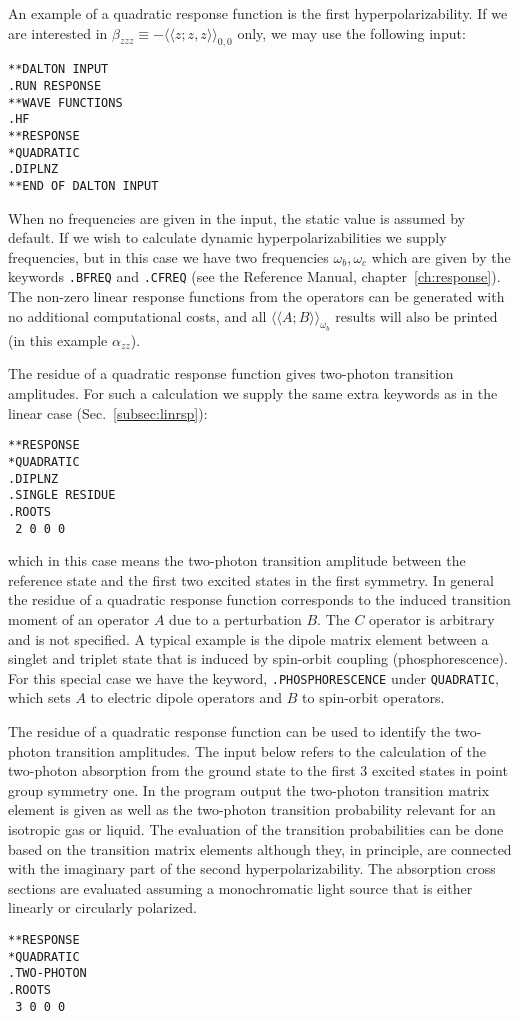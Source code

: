 An example of a quadratic response function
is the first 
hyperpolarizability. If we are
interested in
$\beta_{zzz}\equiv-\langle\!\langle z;z,z\rangle\!\rangle_{0,0}$ 
only, we may use the following input:
\begin{verbatim}
**DALTON INPUT
.RUN RESPONSE
**WAVE FUNCTIONS
.HF
**RESPONSE
*QUADRATIC
.DIPLNZ
**END OF DALTON INPUT
\end{verbatim}
When no frequencies are given in the input, the static value is assumed by
default. If we wish to calculate dynamic hyperpolarizabilities we supply
frequencies, but in this case we have two frequencies
$\omega_b, \omega_c$ which are given by the keywords \texttt{.BFREQ} and
{\tt .CFREQ} (see the Reference Manual, chapter~\ref{ch:response}).
The non-zero linear response functions from the operators can be
generated with no additional computational costs, and all
$\langle\!\langle A;B\rangle\!\rangle_{\omega_b}$ results
will also be printed (in this example $\alpha_{zz}$).

The residue of a quadratic response function gives two-photon
transition amplitudes. For such a
calculation we supply the same extra 
keywords as in the linear case (Sec.~\ref{subsec:linrsp}):
\begin{verbatim}
**RESPONSE
*QUADRATIC
.DIPLNZ
.SINGLE RESIDUE
.ROOTS
 2 0 0 0
\end{verbatim}
which in this case means the two-photon transition
amplitude between the
reference state and the first two excited states in the first symmetry.  In
general the residue of a quadratic response function corresponds to the
induced transition moment of an operator $A$ due to a perturbation $B$.
The $C$ operator is arbitrary and is not specified.  A typical example is
the dipole matrix element between a singlet and triplet state that is
induced by spin-orbit coupling
(phosphorescence). For this special case we 
have the keyword, {\tt .PHOSPHORESCENCE} under {\tt *QUADRATIC}, which sets
$A$ to electric dipole operators and $B$ to spin-orbit operators.

The residue of a quadratic response function can be used to identify
the two-photon transition amplitudes. The input below refers to the
calculation of the two-photon absorption from the ground state to the
first 3 excited states in point group symmetry one. In the program
output the two-photon transition matrix element is given as well as
the two-photon transition probability relevant for an isotropic gas or
liquid. The evaluation of the transition probabilities can be done based
on the transition matrix elements although they, in principle, are
connected with the imaginary part of the second
hyperpolarizability. The absorption cross sections are evaluated
assuming a monochromatic light source that is either linearly or
circularly polarized.
\begin{verbatim}
**RESPONSE
*QUADRATIC
.TWO-PHOTON
.ROOTS
 3 0 0 0
\end{verbatim}

